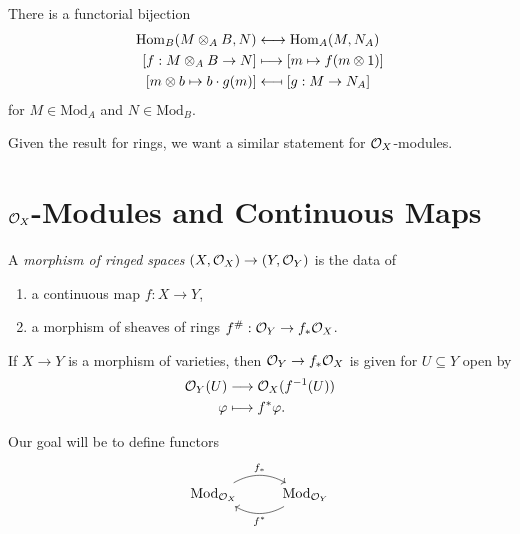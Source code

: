 \begin{prop}
  There is a functorial bijection
  \begin{align*}
    \Hom_B(M \otimes_A B, N)
    &\longleftrightarrow
    \Hom_A(M, N_A) \\
    [f : M \otimes_A B \to N]
    &\longmapsto
    [m \mapsto f(m \otimes 1)] \\
    [m \otimes b \mapsto b \cdot g(m)]
    &\mathrel{\reflectbox{\ensuremath{\longmapsto}}} [g : M \to N_A]
  \end{align*}
  for $M \in \mathrm{Mod}_A$
  and $N \in \mathrm{Mod}_B$.
\end{prop}

\begin{remark}
  Given the result for rings, we
  want a similar statement for
  $\mathcal{O}_X$-modules.
\end{remark}

\section{\texorpdfstring{$\mathcal{O}_X$}{OX}-Modules and Continuous Maps}

\begin{definition}
  A \emph{morphism of ringed spaces}
  $(X, \mathcal{O}_X) \to (Y, \mathcal{O}_Y)$
  is the data of
  \begin{enumerate}
    \item a continuous map $f : X \to Y$,
    \item a morphism of sheaves
      of rings $f^\# : \mathcal{O}_Y \to f_* \mathcal{O}_X$.
  \end{enumerate}
\end{definition}

\begin{example}
  If $X \to Y$ is a morphism of
  varieties, then
  $\mathcal{O}_Y \to f_* \mathcal{O}_X$ is given
  for $U \subseteq Y$ open by
  \begin{align*}
    \mathcal{O}_Y(U) &\longrightarrow
    \mathcal{O}_X(f^{-1}(U)) \\
    \varphi &\longmapsto f^* \varphi.
  \end{align*}
\end{example}

\begin{remark}
  Our goal will be to define
  functors
  \[
    \begin{tikzcd}
      \mathrm{Mod}_{\OO_X}
      \ar[r, bend left, "f_*"]
      & \mathrm{Mod}_{\OO_Y}
      \ar[l, bend left, "f^{*}"]
    \end{tikzcd}
  \]
\end{remark}

